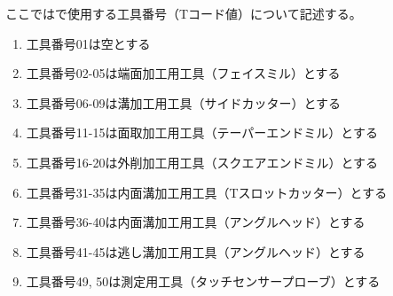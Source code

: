 

ここでは\DMname で使用する工具番号（Tコード値）について記述する。


\begin{enumerate}[label=\Roman*), ref=\Roman*)]
\item 工具番号01は空とする
\item 工具番号02-05は端面加工用工具（フェイスミル）とする
\item 工具番号06-09は溝加工用工具（サイドカッター）とする
\item 工具番号11-15は面取加工用工具（テーパーエンドミル）とする
\item 工具番号16-20は外削加工用工具（スクエアエンドミル）とする
\item 工具番号31-35は内面溝加工用工具（Tスロットカッター）とする
\item 工具番号36-40は内面溝加工用工具（アングルヘッド）とする
\item 工具番号41-45は逃し溝加工用工具（アングルヘッド）とする
\item 工具番号49, 50は測定用工具（タッチセンサープローブ）とする
\end{enumerate}


